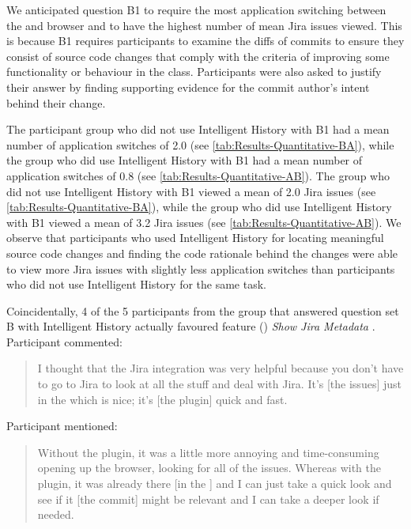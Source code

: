 We anticipated question B1 to require the most application switching between the  
and browser and to have the highest number of mean Jira issues viewed.
This is because B1 requires participants to examine the diffs of commits to ensure they consist of source code changes 
that comply with the criteria of improving some functionality or behaviour in the  class.
Participants were also asked to justify their answer by finding supporting evidence for the commit author's intent behind their change.

The participant group who did not use Intelligent History with B1 had a mean number of application switches of 2.0 (see \autoref{tab:Results-Quantitative-BA}),
while the group who did use Intelligent History with B1 had a mean number of application switches of 0.8 (see \autoref{tab:Results-Quantitative-AB}).
The group who did not use Intelligent History with B1 viewed a mean of 2.0 Jira issues (see \autoref{tab:Results-Quantitative-BA}),
while the group who did use Intelligent History with B1 viewed a mean of 3.2 Jira issues (see \autoref{tab:Results-Quantitative-AB}).
We observe that participants who used Intelligent History for locating meaningful source code changes and finding the code rationale behind the changes
were able to view more Jira issues with slightly less application switches than participants who did not use Intelligent History for the same task.

Coincidentally, 4 of the 5 participants from the group that answered question set B with 
Intelligent History actually favoured feature () \textit{Show Jira Metadata} .
Participant  commented:

\begin{quote}
  I thought that the Jira integration was very helpful because you don’t have to go to Jira to look at all the stuff and deal with Jira. 
  It’s [the issues] just in the  which is nice; it’s [the plugin] quick and fast.
\end{quote}

Participant  mentioned:

\begin{quote}
  Without the plugin, it was a little more annoying and time-consuming opening up the browser, 
  looking for all of the issues. 
  Whereas with the plugin, 
  it was already there [in the ] and I can just take a quick look and see if it [the commit] 
  might be relevant and I can take a deeper look if needed.
\end{quote}

